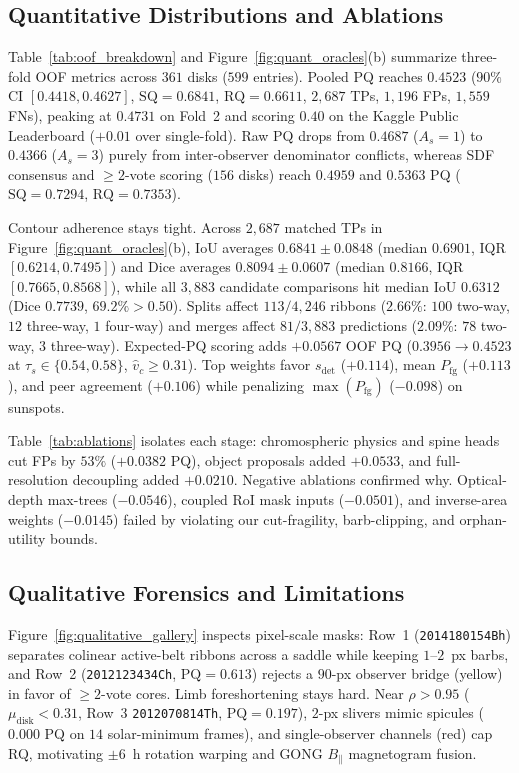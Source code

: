 \documentclass[sigconf]{acmart}
\begin{document}
\subsection{Quantitative Distributions and Ablations}
    Table~\ref{tab:oof_breakdown} and Figure~\ref{fig:quant_oracles}(b) summarize three-fold OOF metrics across $361$ disks ($599$ entries). Pooled PQ reaches $0.4523$ ($90\%$ CI $[0.4418,\allowbreak 0.4627]$, $\text{SQ}=0.6841$, $\text{RQ}=0.6611$, $2{,}687$ TPs, $1{,}196$ FPs, $1{,}559$ FNs), peaking at $0.4731$ on Fold~2 and scoring $0.40$ on the Kaggle Public Leaderboard ($+0.01$ over single-fold). Raw PQ drops from $0.4687$ ($A_s = 1$) to $0.4366$ ($A_s = 3$) purely from inter-observer denominator conflicts, whereas SDF consensus and $\ge 2$-vote scoring ($156$ disks) reach $0.4959$ and $0.5363$ PQ ($\text{SQ}=0.7294$, $\text{RQ}=0.7353$).

    Contour adherence stays tight. Across $2{,}687$ matched TPs in Figure~\ref{fig:quant_oracles}(b), IoU averages $0.6841 \pm 0.0848$ (median $0.6901$, IQR $[0.6214,\allowbreak 0.7495]$) and Dice averages $0.8094 \pm 0.0607$ (median $0.8166$, IQR $[0.7665,\allowbreak 0.8568]$), while all $3{,}883$ candidate comparisons hit median IoU $0.6312$ (Dice $0.7739$, $69.2\% > 0.50$). Splits affect $113/\allowbreak 4{,}246$ ribbons ($2.66\%$: $100$ two-way, $12$ three-way, $1$ four-way) and merges affect $81/\allowbreak 3{,}883$ predictions ($2.09\%$: $78$ two-way, $3$ three-way). Expected-PQ scoring adds $+0.0567$ OOF PQ ($0.3956 \to 0.4523$ at $\tau_s \in \{0.54,\allowbreak 0.58\}$, $\hat{v}_c \ge 0.31$). Top weights favor $s_{\text{det}}$ ($+0.114$), mean $P_{\text{fg}}$ ($+0.113$), and peer agreement ($+0.106$) while penalizing $\max(P_{\text{fg}})$ ($-0.098$) on sunspots.

    Table~\ref{tab:ablations} isolates each stage: chromospheric physics and spine heads cut FPs by $53\%$ ($+0.0382$ PQ), object proposals added $+0.0533$, and full-resolution decoupling added $+0.0210$. Negative ablations confirmed why. Optical-depth max-trees ($-0.0546$), coupled RoI mask inputs ($-0.0501$), and inverse-area weights ($-0.0145$) failed by violating our cut-fragility, barb-clipping, and orphan-utility bounds.

\subsection{Qualitative Forensics and Limitations}
    Figure~\ref{fig:qualitative_gallery} inspects pixel-scale masks: Row~1 (\texttt{2014\allowbreak 180154Bh}) separates colinear active-belt ribbons across a saddle while keeping $1$--$2$~px barbs, and Row~2 (\texttt{2012\allowbreak 123434Ch}, $\text{PQ}=0.613$) rejects a $90$-px observer bridge (yellow) in favor of $\ge 2$-vote cores. Limb foreshortening stays hard. Near $\rho > 0.95$ ($\mu_{\text{disk}} < 0.31$, Row~3 \texttt{2012\allowbreak 070814Th}, $\text{PQ}=0.197$), $2$-px slivers mimic spicules ($0.000$ PQ on $14$ solar-minimum frames), and single-observer channels (red) cap RQ, motivating $\pm 6$~h rotation warping and GONG $B_\parallel$ magnetogram fusion.
\end{document}
